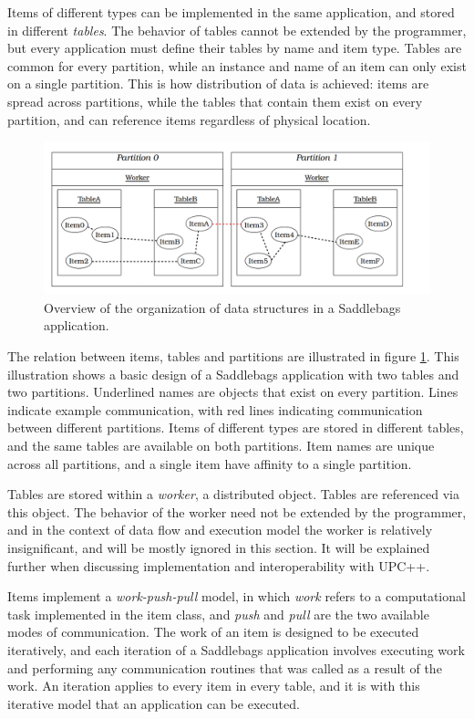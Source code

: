 \documentclass{uit-report}
\begin{document}
Items of different types can be implemented in the same application, and stored in different \emph{tables}. The behavior of tables cannot be extended by the programmer, but every application must define their tables by name and item type. Tables are common for every partition, while an instance and name of an item can only exist on a single partition. This is how distribution of data is achieved: items are spread across partitions, while the tables that contain them exist on every partition, and can reference items regardless of physical location.

\begin{figure}[h]
\centering
\includegraphics[width=15cm]{illustrations/png/basicmodel.png}
\caption{Overview of the organization of data structures in a Saddlebags application.}
\label{fig:basicmodel}
\end{figure}

The relation between items, tables and partitions are illustrated in figure \ref{fig:basicmodel}. This illustration shows a basic design of a Saddlebags application with two tables and two partitions. Underlined names are objects that exist on every partition. Lines indicate example communication, with red lines indicating communication between different partitions. Items of different types are stored in different tables, and the same tables are available on both partitions. Item names are unique across all partitions, and a single item have affinity to a single partition. 

Tables are stored within a \emph{worker}, a distributed object. Tables are referenced via this object. The behavior of the worker need not be extended by the programmer, and in the context of data flow and execution model the worker is relatively insignificant, and will be mostly ignored in this section. It will be explained further when discussing implementation and interoperability with UPC++.

Items implement a \emph{work-push-pull} model, in which \emph{work} refers to a computational task implemented in the item class, and \emph{push} and \emph{pull} are the two available modes of communication. The work of an item is designed to be executed iteratively, and each iteration of a Saddlebags application involves executing work and performing any communication routines that was called as a result of the work. An iteration applies to every item in every table, and it is with this iterative model that an application can be executed. 
\end{document}
